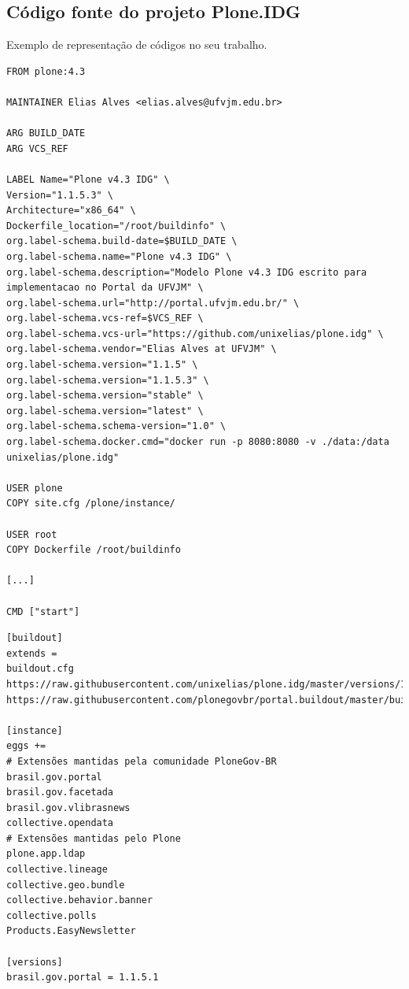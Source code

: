 \subsection{Código fonte do projeto Plone.IDG}\label{ap:cod-ploneidg}

Exemplo de representação de códigos no seu trabalho.

\begin{lstlisting}[caption={\textit{Dockerfile} modificada com alterações realizadas para implementar o \textit{Plone} na UFVJM},label={cod:plonedocker-mod}]
FROM plone:4.3

MAINTAINER Elias Alves <elias.alves@ufvjm.edu.br>

ARG BUILD_DATE
ARG VCS_REF

LABEL Name="Plone v4.3 IDG" \
Version="1.1.5.3" \
Architecture="x86_64" \
Dockerfile_location="/root/buildinfo" \
org.label-schema.build-date=$BUILD_DATE \
org.label-schema.name="Plone v4.3 IDG" \
org.label-schema.description="Modelo Plone v4.3 IDG escrito para implementacao no Portal da UFVJM" \
org.label-schema.url="http://portal.ufvjm.edu.br/" \
org.label-schema.vcs-ref=$VCS_REF \
org.label-schema.vcs-url="https://github.com/unixelias/plone.idg" \
org.label-schema.vendor="Elias Alves at UFVJM" \
org.label-schema.version="1.1.5" \
org.label-schema.version="1.1.5.3" \
org.label-schema.version="stable" \
org.label-schema.version="latest" \
org.label-schema.schema-version="1.0" \
org.label-schema.docker.cmd="docker run -p 8080:8080 -v ./data:/data unixelias/plone.idg"

USER plone
COPY site.cfg /plone/instance/

USER root
COPY Dockerfile /root/buildinfo

[...]

CMD ["start"]
\end{lstlisting}
\legend{Fonte: Autor}


\begin{lstlisting}[caption={\textit{site.cfg} modificado para instalar pacotes adicionais ao \textit{Plone} com IDG},label={cod:site-cfg-mod}]
[buildout]
extends =
buildout.cfg
https://raw.githubusercontent.com/unixelias/plone.idg/master/versions/1.1.5.3/versions.cfg
https://raw.githubusercontent.com/plonegovbr/portal.buildout/master/buildout.d/maintenance.cfg

[instance]
eggs +=
# Extensões mantidas pela comunidade PloneGov-BR
brasil.gov.portal
brasil.gov.facetada
brasil.gov.vlibrasnews
collective.opendata
# Extensões mantidas pelo Plone
plone.app.ldap
collective.lineage
collective.geo.bundle
collective.behavior.banner
collective.polls
Products.EasyNewsletter

[versions]
brasil.gov.portal = 1.1.5.1
\end{lstlisting}
\legend{Fonte: Autor}

